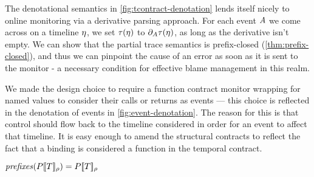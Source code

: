 The denotational semantics in \autoref{fig:tcontract-denotation} lends itself nicely to online monitoring via a derivative parsing approach.
%
For each event $A$ we come across on a timeline $\eta$, we set $\tau(\eta)$ to $\partial_{A}{\tau(\eta)}$, as long as the derivative isn't empty.
%
We can show that the partial trace semantics is prefix-closed (\autoref{thm:prefix-closed}), and thus we can pinpoint the cause of an error as soon as it is sent to the monitor - a necessary condition for effective blame management in this realm.

We made the design choice to require a function contract monitor wrapping for named values to consider their calls or returns as events --- this choice is reflected in the denotation of events in \autoref{fig:event-denotation}.
%
The reason for this is that control should flow back to the timeline considered in order for an event to affect that timeline.
%
It is easy enough to amend the structural contracts to reflect the fact that a binding is considered a function in the temporal contract.

\begin{theorem}
  $\mathit{prefixes}(P[\![ T ]\!]_{\rho}) = P[\![ T ]\!]_{\rho}$
\end{theorem}

